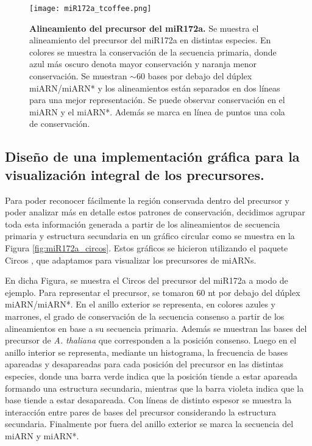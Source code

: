 \begin{landscape}
    \begin{figure}[htbp!] 
        \centering    
        \texttt{[image: miR172a\_tcoffee.png]}
        \caption[Alineamiento del precursor del miR172a.]{
        \textbf{Alineamiento del precursor del miR172a.}
        Se muestra el alineamiento del precursor del miR172a en distintas especies. 
        En colores se muestra la conservación de la secuencia primaria, donde azul más oscuro denota mayor conservación y naranja menor conservación.
        Se muestran $\sim$60 bases por debajo del dúplex miARN/miARN* y los alineamientos están separados en dos líneas para una mejor representación.
        Se puede observar conservación en el miARN y el miARN*.
        Además se marca en línea de puntos una cola de conservación.}
         \label{fig:miR172a_tcoffee}
    \end{figure}
\end{landscape}


\subsection{Diseño de una implementación gráfica para la visualización integral de los precursores.}

Para poder reconocer fácilmente la región conservada dentro del precursor y poder analizar más en detalle estos patrones de conservación, decidimos agrupar toda esta información 
generada a partir de los alineamientos de secuencia primaria y estructura secundaria en un gráfico circular como se muestra en la Figura \ref{fig:miR172a_circos}.
Estos gráficos se hicieron utilizando el paquete Circos \citep{pmid19541911}, que adaptamos para visualizar los precursores de miARNs.
 
En dicha Figura, se muestra el Circos del precursor del miR172a a modo de ejemplo.
Para representar el precursor, se tomaron 60 nt por debajo del dúplex miARN/miARN*.
En el anillo exterior se representa, en colores azules y marrones, el grado de conservación de la secuencia consenso a partir de los alineamientos en base a su secuencia primaria.
Además se muestran las bases del precursor de \textit {A. thaliana} que corresponden a la posición consenso.
Luego en el anillo interior se representa, mediante un histograma, la frecuencia de bases apareadas y desapareadas para cada posición del precursor en las distintas especies, donde una barra verde indica que la posición tiende a estar apareada formando una estructura secundaria, mientras que la barra violeta indica que la base tiende a estar desapareada. 
Con líneas de distinto espesor se muestra la interacción entre pares de bases del precursor considerando la estructura secundaria. 
Finalmente por fuera del anillo exterior se marca la secuencia del miARN y miARN*.

